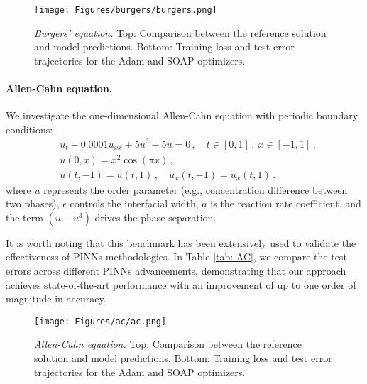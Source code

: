 \begin{figure}
    \centering
    \texttt{[image: Figures/burgers/burgers.png]}
\caption{{\em Burgers' equation.}  Top: Comparison between the reference solution and  model predictions. Bottom: Training loss and test error trajectories for the Adam and SOAP optimizers.}
    \label{fig:burgers}
\end{figure}


\paragraph{Allen-Cahn equation.} We investigate the one-dimensional Allen-Cahn equation with periodic boundary conditions:
\begin{align*}
    &u_{t}-0.0001 u_{x x}+5 u^{3}-5 u=0\,, \quad t \in[0,1]\,,\  x \in[-1,1]\,, \\
    &u(0, x)=x^{2} \cos (\pi x)\,, \\
    &u(t, -1)=u(t, 1)\,, \quad u_{x}(t, -1)=u_{x}(t, 1)\,.
\end{align*}
where $u$ represents the order parameter (e.g., concentration difference between two phases),  $\epsilon$ controls the interfacial width, $a$ is the reaction rate coefficient, and the term $({u}-{u}^3)$ drives the phase separation.

It is worth noting that this benchmark has been extensively used to validate the effectiveness of PINNs methodologies. In Table \ref{tab: AC}, we compare the test errors across different PINNs advancements, demonstrating that our approach achieves state-of-the-art performance with an improvement of up to one order of magnitude in accuracy.


\begin{figure}
    \centering
    \texttt{[image: Figures/ac/ac.png]}
\caption{{\em Allen-Cahn equation.}  Top: Comparison between the reference solution and model predictions. Bottom: Training loss and test error trajectories for the Adam and SOAP optimizers.}
    \label{fig:ac}
\end{figure}


